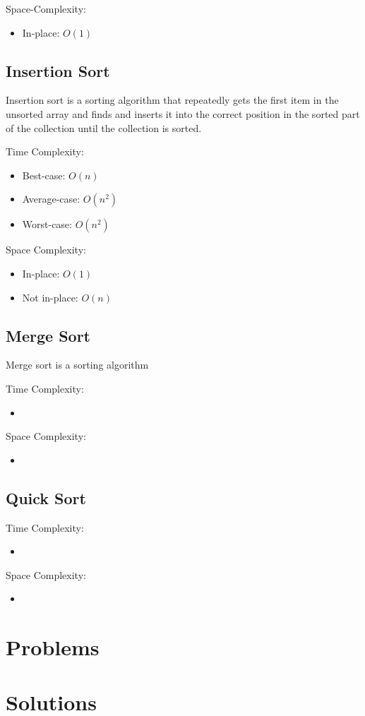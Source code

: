 Space-Complexity:

\begin{itemize}
  \item In-place: $O(1)$
\end{itemize}

\subsection{Insertion Sort}

Insertion sort is a sorting algorithm that repeatedly gets the first item in the unsorted array and finds and inserts it into the correct position in the sorted part of the collection until the collection is sorted.

Time Complexity:

\begin{itemize}
  \item Best-case: $O(n)$
  \item Average-case: $O(n^2)$
  \item Worst-case: $O(n^2)$
\end{itemize}

Space Complexity:

\begin{itemize}
  \item In-place: $O(1)$
  \item Not in-place: $O(n)$
\end{itemize}

\subsection{Merge Sort}

Merge sort is a sorting algorithm 

Time Complexity:

\begin{itemize}
  \item 
\end{itemize}

Space Complexity:

\begin{itemize}
  \item 
\end{itemize}

\subsection{Quick Sort}

Time Complexity:

\begin{itemize}
  \item 
\end{itemize}

Space Complexity:

\begin{itemize}
  \item 
\end{itemize}

\section{Problems}

\section{Solutions}
